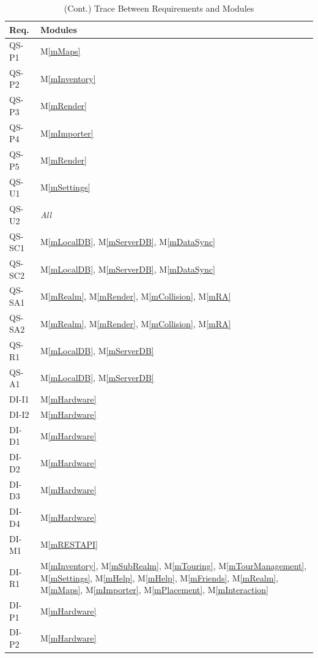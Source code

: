 \documentclass[12pt, titlepage]{article}
\newcommand{\mref}[1]{M\ref{#1}}
\begin{document}
\begin{table}[H]
\centering
\begin{tabular}{p{} p{}}
\toprule
\textbf{Req.} & \textbf{Modules}\\
\midrule
QS-P1 & \mref{mMaps}\\
QS-P2 & \mref{mInventory}\\
QS-P3 & \mref{mRender}\\
QS-P4 & \mref{mImporter}\\
QS-P5 & \mref{mRender}\\
QS-U1 & \mref{mSettings}\\
QS-U2 & \textit{All}\\
QS-SC1 & \mref{mLocalDB}, \mref{mServerDB}, \mref{mDataSync}\\
QS-SC2 & \mref{mLocalDB}, \mref{mServerDB}, \mref{mDataSync}\\
QS-SA1 & \mref{mRealm}, \mref{mRender}, \mref{mCollision}, \mref{mRA}\\
QS-SA2 & \mref{mRealm}, \mref{mRender}, \mref{mCollision}, \mref{mRA}\\
QS-R1 & \mref{mLocalDB}, \mref{mServerDB}\\
QS-A1 & \mref{mLocalDB}, \mref{mServerDB}\\
DI-I1 & \mref{mHardware}\\
DI-I2 & \mref{mHardware}\\
DI-D1 & \mref{mHardware}\\
DI-D2 & \mref{mHardware}\\
DI-D3 & \mref{mHardware}\\
DI-D4 & \mref{mHardware}\\
DI-M1 & \mref{mRESTAPI}\\
DI-R1 & \mref{mInventory}, \mref{mSubRealm}, \mref{mTouring}, \mref{mTourManagement}, \mref{mSettings}, \mref{mHelp}, \mref{mHelp}, \mref{mFriends}, \mref{mRealm}, \mref{mMaps}, \mref{mImporter}, \mref{mPlacement}, \mref{mInteraction}\\
DI-P1 & \mref{mHardware}\\
DI-P2 & \mref{mHardware}\\
\bottomrule
\end{tabular}
\caption{(Cont.) Trace Between Requirements and Modules}
\label{TblRT}
\end{table}
\end{document}
